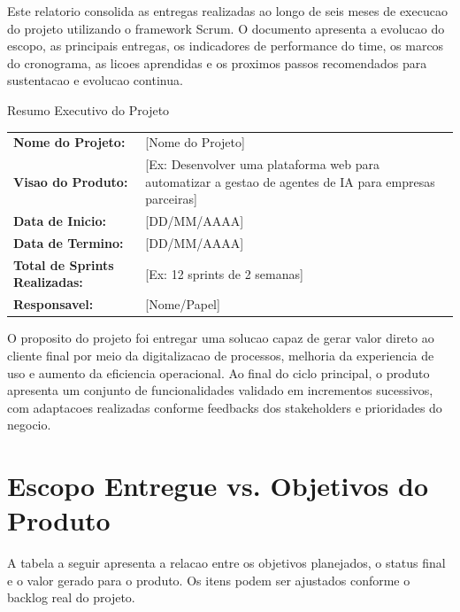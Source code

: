 \documentclass[12pt,a4paper]{article}
\newcommand{\placeholder}[1]{\textcolor{MediumGray}{[#1]}}
\begin{document}
Este relatorio consolida as entregas realizadas ao longo de seis meses de execucao do projeto utilizando o framework Scrum. O documento apresenta a evolucao do escopo, as principais entregas, os indicadores de performance do time, os marcos do cronograma, as licoes aprendidas e os proximos passos recomendados para sustentacao e evolucao continua.

\begin{infobox}{Resumo Executivo do Projeto}
  \begin{tabularx}{\textwidth}{@{}L{5cm}Y@{}}
    \textbf{Nome do Projeto:} & \placeholder{Nome do Projeto} \\
    \textbf{Visao do Produto:} & \placeholder{Ex: Desenvolver uma plataforma web para automatizar a gestao de agentes de IA para empresas parceiras} \\
    \textbf{Data de Inicio:} & \placeholder{DD/MM/AAAA} \\
    \textbf{Data de Termino:} & \placeholder{DD/MM/AAAA} \\
    \textbf{Total de Sprints Realizadas:} & \placeholder{Ex: 12 sprints de 2 semanas} \\
    \textbf{Responsavel:} & \placeholder{Nome/Papel} \\
  \end{tabularx}
\end{infobox}

O proposito do projeto foi entregar uma solucao capaz de gerar valor direto ao cliente final por meio da digitalizacao de processos, melhoria da experiencia de uso e aumento da eficiencia operacional. Ao final do ciclo principal, o produto apresenta um conjunto de funcionalidades validado em incrementos sucessivos, com adaptacoes realizadas conforme feedbacks dos stakeholders e prioridades do negocio.

\section{Escopo Entregue vs. Objetivos do Produto}

A tabela a seguir apresenta a relacao entre os objetivos planejados, o status final e o valor gerado para o produto. Os itens podem ser ajustados conforme o backlog real do projeto.
\end{document}
